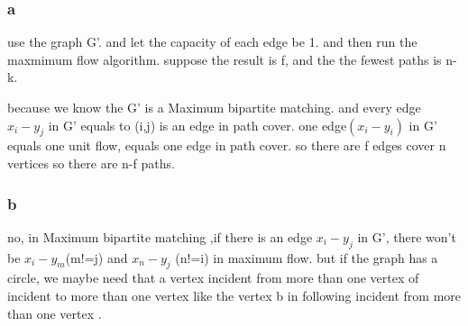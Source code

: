\documentclass[a4paper,UTF8]{article}
\theoremstyle{definition}
\begin{document}
\subsubsection*{a}

use the graph G'. and let the capacity of each edge be 1. and then run the maxmimum flow algorithm.
suppose the result is f, and the the fewest paths is n-k.

because we know the G' is a Maximum bipartite matching. and every edge $x_i-y_j$ in G' equals to (i,j) is an edge in path cover.
one edge$(x_i-y_i)$ in G' equals one unit flow, equals one edge in path cover. so there are f edges cover n vertices so there are n-f paths.

\subsubsection*{b}
no,  in Maximum bipartite matching ,if there is an edge $x_i-y_j$ in G', there won't be  $x_i-y_m$(m!=j) and  $x_n-y_j$ (n!=i) in maximum flow.
but if the graph has a circle, we maybe need that a vertex incident from  more than one vertex of incident to more than one vertex like the vertex b in following incident from more than one vertex .

\end{document}
